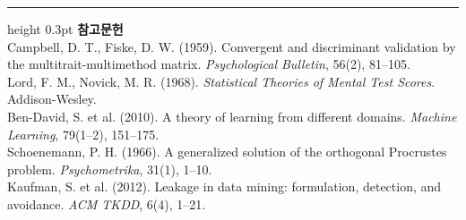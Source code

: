 \documentclass[10pt]{article}
\begin{document}
\vspace{0.6em}
\hrule height 0.3pt
\vspace{0.5em}
{\footnotesize
\textbf{참고문헌}\\[0.3em]
Campbell, D. T., Fiske, D. W. (1959). Convergent and discriminant validation by
the multitrait-multimethod matrix. \emph{Psychological Bulletin}, 56(2), 81--105.\\[0.15em]
Lord, F. M., Novick, M. R. (1968). \emph{Statistical Theories of Mental Test
Scores}. Addison-Wesley.\\[0.15em]
Ben-David, S. et al. (2010). A theory of learning from different domains.
\emph{Machine Learning}, 79(1--2), 151--175.\\[0.15em]
Schoenemann, P. H. (1966). A generalized solution of the orthogonal Procrustes
problem. \emph{Psychometrika}, 31(1), 1--10.\\[0.15em]
Kaufman, S. et al. (2012). Leakage in data mining: formulation, detection, and
avoidance. \emph{ACM TKDD}, 6(4), 1--21.
}
\end{document}
